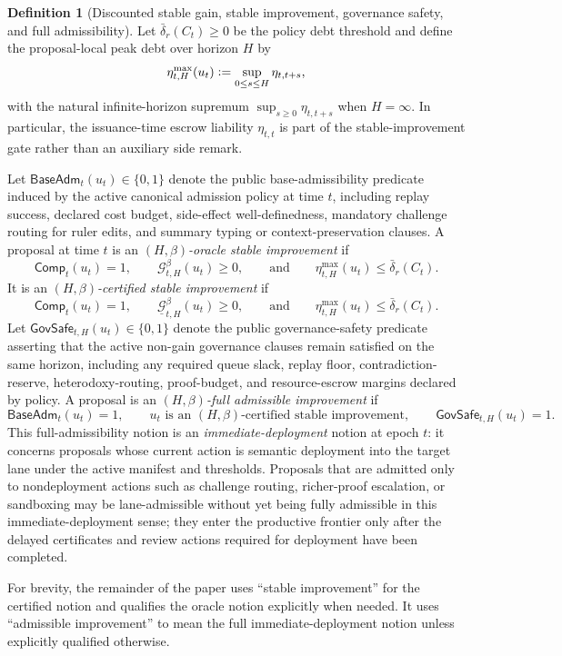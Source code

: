 \documentclass[11pt]{article}
\theoremstyle{definition}
\newtheorem{definition}[theorem]{Definition}
\newcommand{\1}{\mathbf{1}}
\newcommand{\Defeq}{\vcentcolon=}
\begin{document}
\begin{definition}[Discounted stable gain, stable improvement, governance safety, and full admissibility]
Let $\bar\delta_r(C_t)\ge 0$ be the policy debt threshold and define the proposal-local peak debt over horizon $H$ by
\[
\eta_{t,H}^{\max}(u_t)\Defeq \sup_{0\le s\le H}\eta_{t,t+s},
\]
with the natural infinite-horizon supremum $\sup_{s\ge 0}\eta_{t,t+s}$ when $H=\infty$. In particular, the issuance-time escrow liability $\eta_{t,t}$ is part of the stable-improvement gate rather than an auxiliary side remark.

Let $\mathsf{BaseAdm}_t(u_t)\in\{0,1\}$ denote the public base-admissibility predicate induced by the active canonical admission policy at time $t$, including replay success, declared cost budget, side-effect well-definedness, mandatory challenge routing for ruler edits, and summary typing or context-preservation clauses. A proposal at time $t$ is an \emph{$(H,\beta)$-oracle stable improvement} if
\[
\mathsf{Comp}_t(u_t)=1,
\qquad
\mathcal G_{t,H}^{\beta}(u_t)\ge 0,
\qquad\text{and}\qquad
\eta_{t,H}^{\max}(u_t)\le \bar\delta_r(C_t).
\]
It is an \emph{$(H,\beta)$-certified stable improvement} if
\[
\mathsf{Comp}_t(u_t)=1,
\qquad
\underline{\mathcal G}_{t,H}^{\beta}(u_t)\ge 0,
\qquad\text{and}\qquad
\eta_{t,H}^{\max}(u_t)\le \bar\delta_r(C_t).
\]
Let $\mathsf{GovSafe}_{t,H}(u_t)\in\{0,1\}$ denote the public governance-safety predicate asserting that the active non-gain governance clauses remain satisfied on the same horizon, including any required queue slack, replay floor, contradiction-reserve, heterodoxy-routing, proof-budget, and resource-escrow margins declared by policy. A proposal is an \emph{$(H,\beta)$-full admissible improvement} if
\[
\mathsf{BaseAdm}_t(u_t)=1,\qquad
u_t\text{ is an }(H,\beta)\text{-certified stable improvement},\qquad
\mathsf{GovSafe}_{t,H}(u_t)=1.
\]
This full-admissibility notion is an \emph{immediate-deployment} notion at epoch $t$: it concerns proposals whose current action is semantic deployment into the target lane under the active manifest and thresholds. Proposals that are admitted only to nondeployment actions such as challenge routing, richer-proof escalation, or sandboxing may be lane-admissible without yet being fully admissible in this immediate-deployment sense; they enter the productive frontier only after the delayed certificates and review actions required for deployment have been completed.

For brevity, the remainder of the paper uses ``stable improvement'' for the certified notion and qualifies the oracle notion explicitly when needed. It uses ``admissible improvement'' to mean the full immediate-deployment notion unless explicitly qualified otherwise.
\end{definition}
\end{document}
